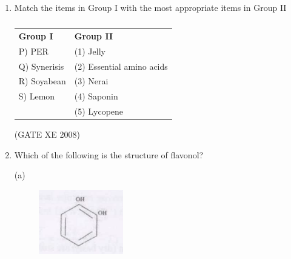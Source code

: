 \documentclass[12pt]{article}
\begin{document}
\begin{enumerate}
(GATE XE 2008)

\item \noindent Match the items in Group I with the most appropriate items in Group II  

\begin{table}[H]     \centering     \caption{}     \label{}     \begin{tabular}{l l}
\textbf{Group I} & \textbf{Group II} \\
P) PER & (1) Jelly \\
Q) Synerisis & (2) Essential amino acids \\
R) Soyabean & (3) Nerai \\
S) Lemon & (4) Saponin \\
 & (5) Lycopene \\
\end{tabular} \end{table}  

\begin{enumerate}
\end{enumerate}

(GATE XE 2008)

\item Which of the following is the structure of flavonol? 

\begin{multicols}{2}

(a) \begin{figure}[H]
    \centering
    \includegraphics[width=0.7\columnwidth]{figs/ass1_i_q14_1.png}
    \caption{}
    \end{figure}


\end{multicols}
\end{enumerate}
\end{document}

